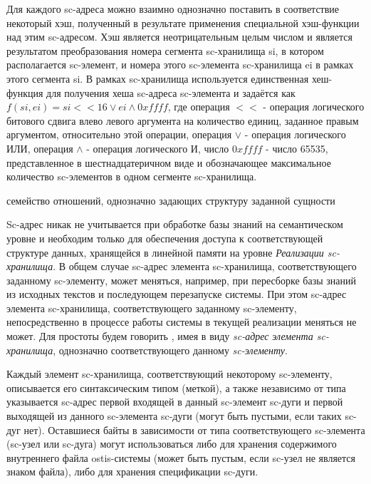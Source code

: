 Для каждого sc-адреса можно взаимно однозначно поставить в соответствие некоторый хэш, полученный в результате применения
специальной хэш-функции над этим sc-адресом. Хэш является неотрицательным целым числом и является результатом
преобразования номера сегмента sc-хранилища si, в котором располагается sc-элемент, и номера этого sc-элемента
sc-хранилища ei в рамках этого сегмента si. В рамках sc-хранилища используется единственная хеш-функция для
получения хеша sc-адреса sc-элемента и задаётся как $f(si, ei) = si << 16 \vee ei \wedge 0xffff$, где операция $<<$ -
операция логического битового сдвига влево левого аргумента на количество единиц, заданное правым аргументом, относительно
этой операции, операция $\vee$ - операция логического ИЛИ, операция $\wedge$ - операция логического И, число $0xffff$ -
число 65535, представленное в шестнадцатеричном виде и обозначающее максимальное количество sc-элементов в одном сегменте
sc-хранилища.

\begin{SCn}
\begin{scnrelfromlist}{семейство отношений, однозначно задающих структуру заданной сущности}
\end{scnrelfromlist}
\end{SCn}

Sc-адрес никак не учитывается при обработке базы знаний на семантическом уровне и необходим только для обеспечения
доступа к соответствующей структуре данных, хранящейся в линейной памяти на уровне \textit{Реализации sc-хранилища}.
В общем случае sc-адрес элемента sc-хранилища, соответствующего заданному sc-элементу, может меняться, например, при
пересборке базы знаний из исходных текстов и последующем перезапуске системы. При этом sc-адрес элемента sc-хранилища,
соответствующего заданному sc-элементу, непосредственно в процессе работы системы в текущей реализации меняться не может.
Для простоты будем говорить , имея в виду \textit{sc-адрес} \textit{элемента sc-хранилища},
однозначно соответствующего данному \textit{sc-элементу}.

Каждый элемент sc-хранилища, соответствующий некоторому sc-элементу, описывается его синтаксическим типом (меткой), а
также независимо от типа указывается sc-адрес первой входящей в данный sc-элемент sc-дуги и первой выходящей из данного
sc-элемента sc-дуги (могут быть пустыми, если таких sc-дуг нет). Оставшиеся байты в зависимости от типа соответствующего
sc-элемента (sc-узел или sc-дуга) могут использоваться либо для хранения содержимого внутреннего файла ostis-системы
(может быть пустым, если sc-узел не является знаком файла), либо для хранения спецификации sc-дуги.

